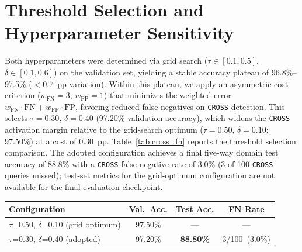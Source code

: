 \documentclass[a4paper,fleql,doubleblind]{cas-sc}
\begin{document}
\section{Threshold Selection and Hyperparameter Sensitivity}
\label{supp:threshold}

Both hyperparameters were determined via grid search
($\tau \in [0.1, 0.5]$, $\delta \in [0.1, 0.6]$) on the validation set,
yielding a stable accuracy plateau of 96.8\%--97.5\% ($<0.7$~pp variation).
Within this plateau, we apply an asymmetric cost criterion
($w_{\text{FN}}=3$, $w_{\text{FP}}=1$) that minimizes the weighted error
$w_{\text{FN}} \cdot \text{FN} + w_{\text{FP}} \cdot \text{FP}$, favoring
reduced false negatives on \texttt{CROSS} detection. This selects
$\tau = 0.30$, $\delta = 0.40$ (97.20\% validation accuracy), which widens
the \texttt{CROSS} activation margin relative to the grid-search optimum
($\tau = 0.50$, $\delta = 0.10$; 97.50\%) at a cost of 0.30~pp.
Table~\ref{tab:cross_fn} reports the threshold selection comparison.
The adopted configuration achieves a final five-way domain test accuracy of
88.8\% with a \texttt{CROSS} false-negative rate of 3.0\% (3 of 100 \texttt{CROSS}
queries missed); test-set metrics for the grid-optimum configuration are not
available for the final evaluation checkpoint.

\vspace{6pt plus 4pt minus 3pt}
\begin{center}
\begingroup
{}
\label{tab:cross_fn}
\begin{tabular}{lccc}
\toprule
\textbf{Configuration} & \textbf{Val.\ Acc.} & \textbf{Test Acc.} & \textbf{FN Rate} \\
\midrule
$\tau$=0.50, $\delta$=0.10 (grid optimum) & 97.50\% & --- & --- \\
$\tau$=0.30, $\delta$=0.40 (adopted)      & 97.20\% & \textbf{88.80\%} & 3/100\ (3.0\%) \\
\bottomrule
\end{tabular}
\endgroup
\end{center}
\vspace{6pt plus 4pt minus 3pt}
\end{document}
